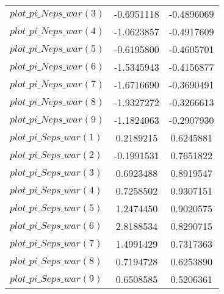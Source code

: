 \begin{center}
\begin{longtable}{lcc}
$plot\_pi\_N eps\_war (3)   $	 & 	     -0.6951118	 & 	     -0.4896069 \\ 
$plot\_pi\_N eps\_war (4)   $	 & 	     -1.0623857	 & 	     -0.4917609 \\ 
$plot\_pi\_N eps\_war (5)   $	 & 	     -0.6195800	 & 	     -0.4605701 \\ 
$plot\_pi\_N eps\_war (6)   $	 & 	     -1.5345943	 & 	     -0.4156877 \\ 
$plot\_pi\_N eps\_war (7)   $	 & 	     -1.6716690	 & 	     -0.3690491 \\ 
$plot\_pi\_N eps\_war (8)   $	 & 	     -1.9327272	 & 	     -0.3266613 \\ 
$plot\_pi\_N eps\_war (9)   $	 & 	     -1.1824063	 & 	     -0.2907930 \\ 
$plot\_pi\_S eps\_war (1)   $	 & 	      0.2189215	 & 	      0.6245881 \\ 
$plot\_pi\_S eps\_war (2)   $	 & 	     -0.1991531	 & 	      0.7651822 \\ 
$plot\_pi\_S eps\_war (3)   $	 & 	      0.6923488	 & 	      0.8919547 \\ 
$plot\_pi\_S eps\_war (4)   $	 & 	      0.7258502	 & 	      0.9307151 \\ 
$plot\_pi\_S eps\_war (5)   $	 & 	      1.2474450	 & 	      0.9020575 \\ 
$plot\_pi\_S eps\_war (6)   $	 & 	      2.8188534	 & 	      0.8290715 \\ 
$plot\_pi\_S eps\_war (7)   $	 & 	      1.4991429	 & 	      0.7317363 \\ 
$plot\_pi\_S eps\_war (8)   $	 & 	      0.7194728	 & 	      0.6253890 \\ 
$plot\_pi\_S eps\_war (9)   $	 & 	      0.6508585	 & 	      0.5206361 \\ 
\end{longtable}
 \end{center}
